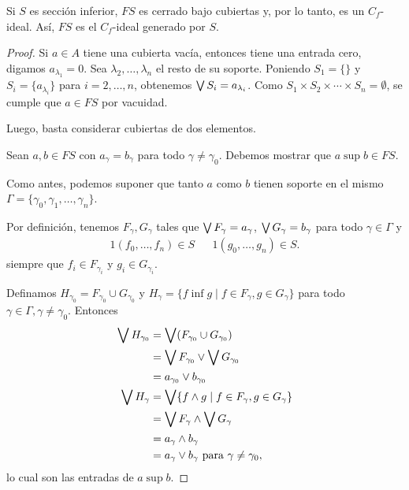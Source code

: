 \begin{lemma}
  Si $S$ es sección inferior, $FS$ es cerrado bajo
  cubiertas y, por lo tanto, es un $C_f$-ideal.
  Así, $FS$ es el $C_f$-ideal generado por $S$.
\end{lemma}
\begin{proof}
  Si $a\in A$ tiene una cubierta vacía, entonces tiene una entrada
  cero, digamos $a_{\lambda_1}=0$.
  Sea $\lambda_2,\dots,\lambda_n$ el resto de su soporte.
  Poniendo $S_1=\{\}$ y $S_i=\{a_{\lambda_i}\}$ para $i=2,\dots,n$,
  obtenemos $\bigvee S_i = a_{\lambda_i}$.
  Como $S_1\times S_2\times\cdots\times S_n=\emptyset$,
  se cumple que $a\in FS$ por vacuidad.

  Luego, basta considerar cubiertas de dos elementos.

  Sean $a,b\in FS$ con $a_\gamma=b_\gamma$ para todo
  $\gamma\neq\gamma_0$.
  Debemos mostrar que $a\sup b\in FS$.

  Como antes, podemos suponer que tanto $a$ como $b$ tienen soporte
  en el mismo $\Gamma=\{\gamma_0,\gamma_1,\dots,\gamma_n\}$.

  Por definición, tenemos $F_\gamma,G_\gamma$ tales que $\bigvee
  F_\gamma = a_\gamma$, $\bigvee G_\gamma = b_\gamma$ para todo
  $\gamma\in\Gamma$ y
  \begin{align*}
    1(f_0,\dots,f_n)\in S && 1(g_0,\dots,g_n)\in S.
  \end{align*}
  siempre que $f_i\in F_{\gamma_i}$ y $g_i\in G_{\gamma_i}$.

  Definamos $H_{\gamma_0}=F_{\gamma_0}\cup G_{\gamma_0}$ y
  $H_\gamma = \{f\inf g\mid f\in F_\gamma,g\in G_\gamma\}$ para
  todo $\gamma\in\Gamma,\gamma\neq\gamma_0$.
  Entonces
  \begin{align*}
    \bigvee H_{\gamma_0}
    &= \bigvee(F_{\gamma_0}\cup G_{\gamma_0}) \\
    &= \bigvee F_{\gamma_0} \vee \bigvee G_{\gamma_0} \\
    &= a_{\gamma_0} \vee b_{\gamma_0}
    \\
    \bigvee H_\gamma
    &= \bigvee\{f\wedge g \mid f\in F_\gamma, g\in G_\gamma\} \\
    &= \bigvee F_\gamma \wedge \bigvee G_\gamma \\
    &= a_\gamma \wedge b_\gamma \\
    &= a_\gamma\vee b_\gamma
    \text{ para } \gamma\neq\gamma_0,
  \end{align*}
  lo cual son las entradas de $a\sup b$.


\end{proof}
